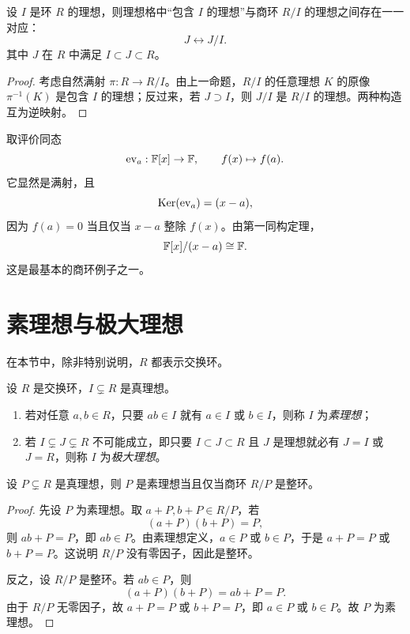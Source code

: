 \begin{corollary}
设 $I$ 是环 $R$ 的理想，则理想格中“包含 $I$ 的理想”与商环 $R/I$ 的理想之间存在一一对应：
\[
J\longleftrightarrow J/I.
\]
其中 $J$ 在 $R$ 中满足 $I\subset J\subset R$。
\end{corollary}

\begin{proof}
考虑自然满射 $\pi:R\to R/I$。由上一命题，$R/I$ 的任意理想 $K$ 的原像 $\pi^{-1}(K)$ 是包含 $I$ 的理想；反过来，若 $J\supset I$，则 $J/I$ 是 $R/I$ 的理想。两种构造互为逆映射。
\end{proof}

\begin{example}
取评价同态
\[
\operatorname{ev}_a:\mathbb{F}[x]\to \mathbb{F},
\qquad f(x)\mapsto f(a).
\]
它显然是满射，且
\[
\mathrm{Ker}(\operatorname{ev}_a)=(x-a),
\]
因为 $f(a)=0$ 当且仅当 $x-a$ 整除 $f(x)$。由第一同构定理，
\[
\mathbb{F}[x]/(x-a)\cong \mathbb{F}.
\]
这是最基本的商环例子之一。
\end{example}

\section{素理想与极大理想}

在本节中，除非特别说明，$R$ 都表示交换环。

\begin{definition}
设 $R$ 是交换环，$I\subsetneq R$ 是真理想。
\begin{enumerate}[label=\textnormal{(\arabic*)}]
  \item 若对任意 $a,b\in R$，只要 $ab\in I$ 就有 $a\in I$ 或 $b\in I$，则称 $I$ 为\emph{素理想}；
  \item 若 $I\subsetneq J\subsetneq R$ 不可能成立，即只要 $I\subset J\subset R$ 且 $J$ 是理想就必有 $J=I$ 或 $J=R$，则称 $I$ 为\emph{极大理想}。
\end{enumerate}
\end{definition}

\begin{theorem}
设 $P\subsetneq R$ 是真理想，则 $P$ 是素理想当且仅当商环 $R/P$ 是整环。
\end{theorem}

\begin{proof}
先设 $P$ 为素理想。取 $a+P,b+P\in R/P$，若
\[
(a+P)(b+P)=P,
\]
则 $ab+P=P$，即 $ab\in P$。由素理想定义，$a\in P$ 或 $b\in P$，于是 $a+P=P$ 或 $b+P=P$。这说明 $R/P$ 没有零因子，因此是整环。

反之，设 $R/P$ 是整环。若 $ab\in P$，则
\[
(a+P)(b+P)=ab+P=P.
\]
由于 $R/P$ 无零因子，故 $a+P=P$ 或 $b+P=P$，即 $a\in P$ 或 $b\in P$。故 $P$ 为素理想。
\end{proof}

